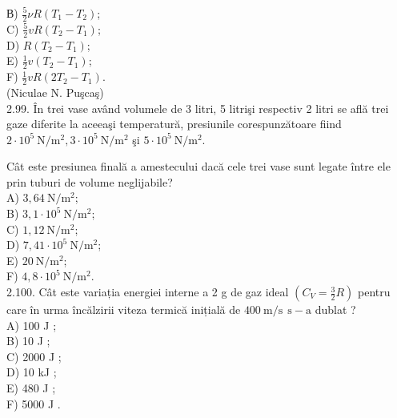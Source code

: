 В) $\frac{5}{2} \nu R\left(T_{1}-T_{2}\right)$;\\
C) $\frac{5}{2} v R\left(T_{2}-T_{1}\right)$;\\
D) $R\left(T_{2}-T_{1}\right)$;\\
E) $\frac{1}{2} v\left(T_{2}-T_{1}\right)$;\\
F) $\frac{1}{2} v R\left(2 T_{2}-T_{1}\right)$.\\
(Niculae N. Puşcaş)\\
2.99. În trei vase având volumele de 3 litri, 5 litrişi respectiv 2 litri se află trei gaze diferite la aceeaşi temperatură, presiunile corespunzătoare fiind $2 \cdot 10^{5} \mathrm{~N} / \mathrm{m}^{2}, 3 \cdot 10^{5} \mathrm{~N} / \mathrm{m}^{2}$ şi $5 \cdot 10^{5} \mathrm{~N} / \mathrm{m}^{2}$.

Cât este presiunea finală a amestecului dacă cele trei vase sunt legate între ele prin tuburi de volume neglijabile?\\
A) $3,64 \mathrm{~N} / \mathrm{m}^{2}$;\\
B) $3,1 \cdot 10^{5} \mathrm{~N} / \mathrm{m}^{2}$;\\
C) $1,12 \mathrm{~N} / \mathrm{m}^{2}$;\\
D) $7,41 \cdot 10^{5} \mathrm{~N} / \mathrm{m}^{2}$;\\
E) $20 \mathrm{~N} / \mathrm{m}^{2}$;\\
F) $4,8 \cdot 10^{5} \mathrm{~N} / \mathrm{m}^{2}$.\\
2.100. Cât este variația energiei interne a 2 g de gaz ideal $\left(C_{V}=\frac{3}{2} R\right)$ pentru care în urma încălzirii viteza termică inițială de $400 \mathrm{~m} / \mathrm{s} ~ \mathrm{~s}-\mathrm{a}$ dublat ?\\
A) 100 J ;\\
B) 10 J ;\\
C) 2000 J ;\\
D) 10 kJ ;\\
E) 480 J ;\\
F) 5000 J .

